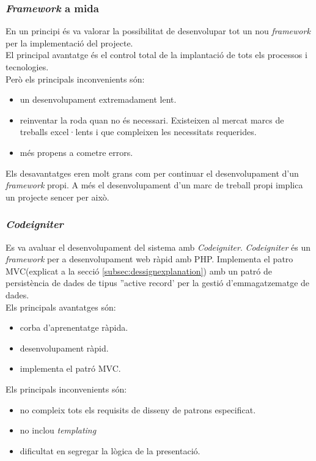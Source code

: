 \subsubsection{\textit{Framework} a mida}
En un principi \'{e}s va valorar la possibilitat de desenvolupar tot un nou \textit{framework} per la implementaci\'{o} del projecte.\\

El principal avantatge \'{e}s el control total de la implantaci\'{o} de tots els processos i tecnologies.\\

Però els principals inconvenients s\'{o}n:
\begin{itemize} 
\item un desenvolupament extremadament lent. 
\item reinventar la roda quan no \'{e}s necessari. Existeixen al mercat marcs de treballs excel·lents i que compleixen les necessitats requerides.
\item m\'{e}s propens a cometre errors.
\end{itemize} 

Els desavantatges eren molt grans com per continuar el desenvolupament d'un \textit{framework} propi. A m\'{e}s el desenvolupament d'un marc de treball propi implica un projecte sencer per això.

\subsubsection{\textit{Codeigniter}}
Es va avaluar el desenvolupament del sistema amb \textit{Codeigniter}. \textit{Codeigniter} \'{e}s un \textit{framework} per a desenvolupament web r\`{a}pid amb PHP.\cite{codeigniter} Implementa el patro MVC(explicat a la secció \ref{subsec:dessignexplanation}) amb un patró de persistència de dades de tipus ''active record' per la gesti\'{o} d'emmagatzematge de dades.\cite{activerecord}\\

Els principals avantatges s\'{o}n:
\begin{itemize}
\item corba d'aprenentatge r\`{a}pida.
\item desenvolupament r\`{a}pid.
\item implementa el patr\'{o} MVC.
\end{itemize}

Els principals inconvenients s\'{o}n:
\begin{itemize}
\item no compleix tots els requisits de disseny de patrons especificat.
\item no inclou \textit{templating}
\item dificultat en segregar la l\`{o}gica de la presentaci\'{o}.
\end{itemize}

